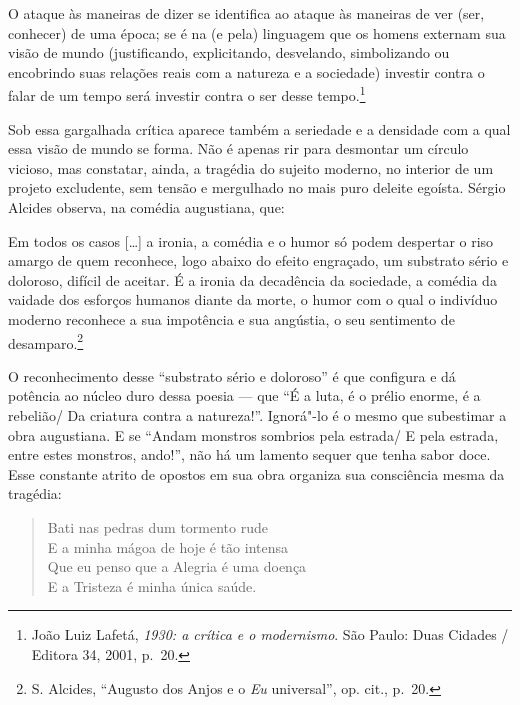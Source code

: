\begin{hedraquote}
O ataque às maneiras de dizer se identifica ao ataque às maneiras de ver
(ser, conhecer) de uma época; se é na (e pela) linguagem que os homens
externam sua visão de mundo (justificando, explicitando, desvelando,
simbolizando ou encobrindo suas relações reais com a natureza e a
sociedade) investir contra o falar de um tempo será investir contra o
ser desse tempo.\footnote{João Luiz Lafetá, \textit{1930: a crítica e o modernismo}. São
Paulo: Duas Cidades / Editora 34, 2001, p.~20.}
\end{hedraquote}

Sob essa gargalhada crítica aparece também a seriedade e a densidade
com a qual essa visão de mundo se forma. Não é apenas rir para
desmontar um círculo vicioso, mas constatar, ainda, a tragédia do
sujeito moderno, no interior de um projeto excludente, sem tensão e
mergulhado no mais puro deleite egoísta. Sérgio Alcides observa, na
comédia augustiana, que:

\begin{hedraquote}
Em todos os casos [\ldots{}] a ironia, a comédia e o humor só podem
despertar o riso amargo de quem reconhece, logo abaixo do efeito
engraçado, um substrato sério e doloroso, difícil de aceitar. É a
ironia da decadência da sociedade, a comédia da vaidade dos esforços
humanos diante da morte, o humor com o qual o indivíduo moderno
reconhece a sua impotência e sua angústia, o seu sentimento de
desamparo.\footnote{S. Alcides, “Augusto dos Anjos e o \textit{Eu} 
universal”, op. cit., p.~20.}
\end{hedraquote}

O reconhecimento desse “substrato sério e doloroso” é que configura
e dá potência ao núcleo duro dessa poesia --- que “É a luta, é o prélio
enorme, é a rebelião/ Da criatura contra a natureza!”. Ignorá"-lo é o
mesmo que subestimar a obra augustiana. E se “Andam monstros sombrios
pela estrada/ E pela estrada, entre estes monstros, ando!”, não há um
lamento sequer que tenha sabor doce. Esse constante atrito de opostos
em sua obra organiza sua consciência mesma da tragédia:

\begin{verse}
Bati nas pedras dum tormento rude\\
E a minha mágoa de hoje é tão intensa\\
Que eu penso que a Alegria é uma doença\\
E a Tristeza é minha única saúde.
\end{verse}

